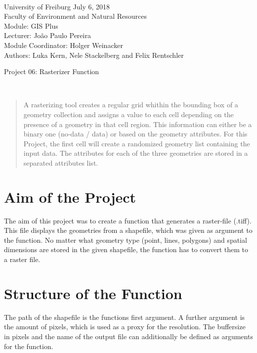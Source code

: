 \documentclass[10pt, a4paper]{article}
\begin{document}
\markboth{}
\\\noindent University of Freiburg \hspace{10cm}  July 6, 2018
\\Faculty of Environment and Natural Resources
\\Module: GIS Plus
\\Lecturer: João Paulo Pereira
\\Module Coordinator: Holger Weinacker
\\Authors: Luka Kern, Nele Stackelberg and Felix Rentschler
\\

\begin{center}
	\huge{Project 06: Rasterizer Function} \vspace{0.5cm}\\
\end{center}

\
\onehalfspacing %



\begin{abstract}
	A rasterizing tool creates a regular grid whithin the bounding box of a geometry collection and assigns a value to each cell depending on the presence of a geometry in that cell region. This information can either be a binary one (no-data / data) or based on the geometry attributes. For this Project, the first cell will create a randomized geometry list containing the input data. The attributes for each of the three geometries are stored in a separated attributes list.
\end{abstract}


\section{Aim of the Project}
The aim of this project was to create a function that generates a raster-file (.tiff). This file displays the geometries from a shapefile, which was given as argument to the function. No matter what geometry type (point, lines, polygons) and spatial dimensions are stored in the given shapefile, the function has to convert them to a raster file. 

\section{Structure of the Function}
The path of the shapefile is the functions first argument. 
A further argument is the amount of pixels, which is used as a proxy for the resolution. The buffersize in pixels and the name of the output file can additionally be defined as arguments for the function. 
\end{document}
